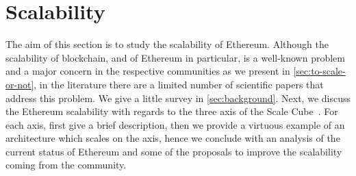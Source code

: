 \section{Scalability}
\label{sec:scalability}

The aim of this section is to study the scalability of Ethereum. Although the
scalability of blockchain, and of Ethereum in particular, is a well-known
problem and a major concern in the respective communities as we present in
\autoref{sec:to-scale-or-not}, in the literature there are a limited number of
scientific papers that address this problem. We give a little survey in
\autoref{sec:background}. Next, we discuss the Ethereum scalability with regards
to the three axis of the Scale Cube~\cite{bib:art-of-scalability}. For each
axis, first give a brief description, then we provide a virtuous example of an
architecture which scales on the axis, hence we conclude with an analysis of the
current status of Ethereum and some of the proposals to improve the scalability
coming from the community.
